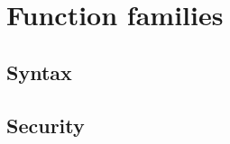 \documentclass[../../main.tex]{subfiles}
\begin{document}
\onlyinsubfile
{
    
}

\section{Function families}\label{sec-ff}
    \subsection{Syntax}
        
    \subsection{Security}
        

\onlyinsubfile
{
    \begin{small}
        
        
    \end{small}
}
\end{document}
